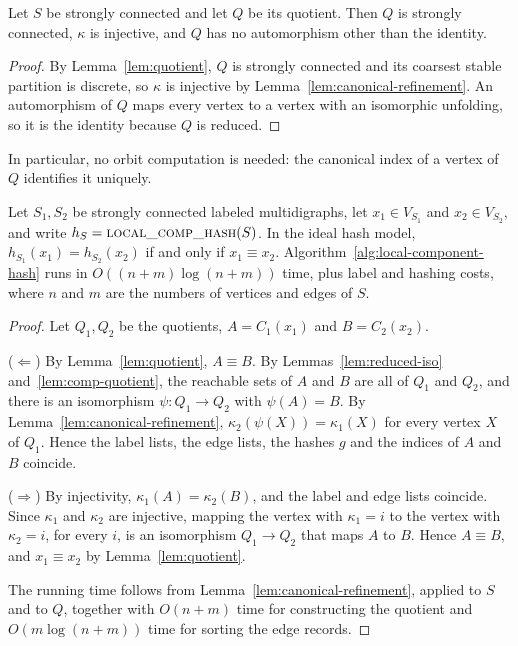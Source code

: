 \documentclass[twoside,leqno]{article}
\begin{document}
\begin{lemma}
\label{lem:comp-quotient}
Let $S$ be strongly connected and let $Q$ be its quotient. Then $Q$ is strongly connected, $\kappa$ is injective, and $Q$ has no automorphism other than the identity.
\end{lemma}
\begin{proof}
By Lemma~\ref{lem:quotient}, $Q$ is strongly connected and its coarsest stable partition is discrete, so $\kappa$ is injective by Lemma~\ref{lem:canonical-refinement}. An automorphism of $Q$ maps every vertex to a vertex with an isomorphic unfolding, so it is the identity because $Q$ is reduced.
\end{proof}

In particular, no orbit computation is needed: the canonical index of a vertex of $Q$ identifies it uniquely.

\begin{theorem}
\label{thm:local-component}
Let $S_1,S_2$ be strongly connected labeled multidigraphs, let $x_1\in V_{S_1}$ and $x_2\in V_{S_2}$, and write $h_S=\textproc{local\_comp\_hash}(S)$. In the ideal hash model, $h_{S_1}(x_1)=h_{S_2}(x_2)$ if and only if $x_1\equiv x_2$. Algorithm~\ref{alg:local-component-hash} runs in $O((n+m)\log(n+m))$ time, plus label and hashing costs, where $n$ and $m$ are the numbers of vertices and edges of $S$.
\end{theorem}
\begin{proof}
Let $Q_1,Q_2$ be the quotients, $A=C_1(x_1)$ and $B=C_2(x_2)$.

($\Leftarrow$) By Lemma~\ref{lem:quotient}, $A\equiv B$. By Lemmas~\ref{lem:reduced-iso} and~\ref{lem:comp-quotient}, the reachable sets of $A$ and $B$ are all of $Q_1$ and $Q_2$, and there is an isomorphism $\psi:Q_1\to Q_2$ with $\psi(A)=B$. By Lemma~\ref{lem:canonical-refinement}, $\kappa_2(\psi(X))=\kappa_1(X)$ for every vertex $X$ of $Q_1$. Hence the label lists, the edge lists, the hashes $g$ and the indices of $A$ and $B$ coincide.

($\Rightarrow$) By injectivity, $\kappa_1(A)=\kappa_2(B)$, and the label and edge lists coincide. Since $\kappa_1$ and $\kappa_2$ are injective, mapping the vertex with $\kappa_1=i$ to the vertex with $\kappa_2=i$, for every $i$, is an isomorphism $Q_1\to Q_2$ that maps $A$ to $B$. Hence $A\equiv B$, and $x_1\equiv x_2$ by Lemma~\ref{lem:quotient}.

The running time follows from Lemma~\ref{lem:canonical-refinement}, applied to $S$ and to $Q$, together with $O(n+m)$ time for constructing the quotient and $O(m\log(n+m))$ time for sorting the edge records.
\end{proof}
\end{document}
